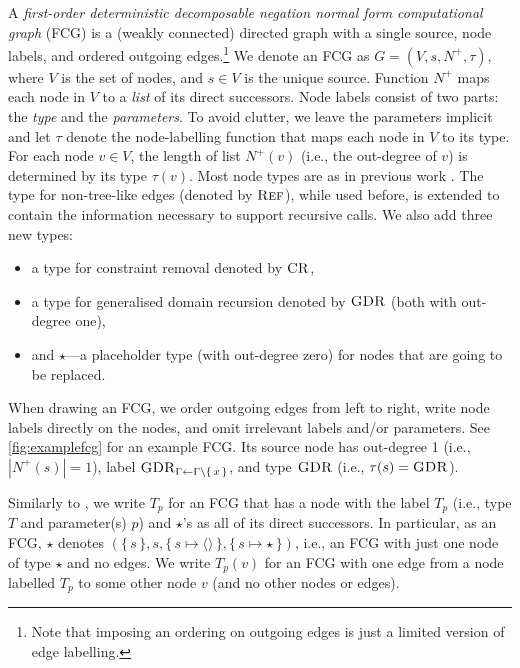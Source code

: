A \emph{first-order deterministic decomposable negation normal form
  computational graph} (FCG) is a (weakly connected) directed graph with a
single source, node labels, and ordered outgoing edges.\footnote{Note that
  imposing an ordering on outgoing edges is just a limited version of edge
  labelling.} We denote an FCG as $G = (V, s, N^+, \tau)$, where $V$ is the set
of nodes, and $s \in V$ is the unique source. Function $N^+$ maps each node in
$V$ to a \emph{list} of its direct successors. Node labels consist of two parts:
the \emph{type} and the \emph{parameters}. To avoid clutter, we leave the
parameters implicit and let $\tau$ denote the node-labelling function that maps
each node in $V$ to its type. For each node $v \in V$, the length of list
$N^+(v)$ (i.e., the out-degree of $v$) is determined by its type $\tau(v)$. Most
node types are as in previous work
\citep{DBLP:conf/nips/Broeck11,DBLP:conf/ijcai/BroeckTMDR11}. The type for
non-tree-like edges (denoted by $\operatorname{\textsc{Ref}}$), while used before, is extended to
contain the information necessary to support recursive calls. We also add three
new types:
\begin{itemize}
  \item a type for constraint removal denoted by $\operatorname{\textsc{CR}}$,
  \item a type for generalised domain recursion denoted by $\operatorname{\textsc{GDR}}$ (both with
        out-degree one),
  \item and $\star$---a placeholder type (with out-degree zero) for nodes that
        are going to be replaced.
\end{itemize}
When drawing an FCG, we order outgoing edges from left to right, write node
labels directly on the nodes, and omit irrelevant labels and/or parameters. See
\cref{fig:examplefcg} for an example FCG\@. Its source node has out-degree 1
(i.e., $|N^+(s)| = 1$), label
$\operatorname{\textsc{GDR}}_{\Gamma \gets \Gamma \setminus \{\, x \,\}}$, and type $\operatorname{\textsc{GDR}}$ (i.e.,
$\tau(s) = \operatorname{\textsc{GDR}}$).

Similarly to \citet{DBLP:conf/ijcai/BroeckTMDR11}, we write $T_p$ for an FCG
that has a node with the label $T_p$ (i.e., type $T$ and parameter(s) $p$) and
$\star$'s as all of its direct successors. In particular, as an FCG, $\star$
denotes
$(\{\, s \,\}, s, \{\, s \mapsto \langle\rangle \,\}, \{\, s \mapsto \star \,\})$,
i.e., an FCG with just one node of type $\star$ and no edges. We write $T_p(v)$
for an FCG with one edge from a node labelled $T_{p}$ to some other node $v$
(and no other nodes or edges).

